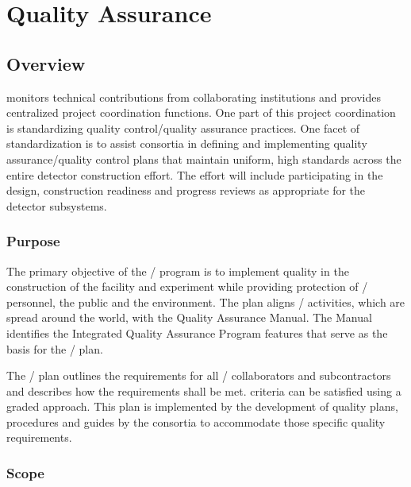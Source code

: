 \chapter{Quality Assurance}
\label{vl:tc-QA}

\section{Overview}

  monitors technical contributions from
collaborating institutions and provides centralized project
coordination functions. One part of this project
coordination is standardizing quality control/quality
assurance practices. One facet of standardization
is to assist consortia in defining and implementing
quality assurance/quality control plans that maintain uniform,
high standards across the entire detector construction
effort. The  effort will include participating in the
design, construction readiness and progress reviews as appropriate for
the  detector subsystems.

\subsection{Purpose}

The primary objective of the /   program
is to implement quality in the construction of the  facility and
 experiment while providing protection of / personnel, the
public and the environment. The  plan aligns /  
activities, which are spread around the world, with the \fnal
Quality Assurance Manual. The Manual identifies the \fnal
Integrated Quality Assurance Program features that serve as the basis
for the /  plan.

The /  plan outlines the 
requirements for all / collaborators and
subcontractors and describes how the requirements shall be met. 
criteria can be satisfied using a graded approach. This  plan is
implemented by the development of quality plans, procedures and guides
by the consortia to accommodate those specific quality requirements.

\subsection{Scope}

